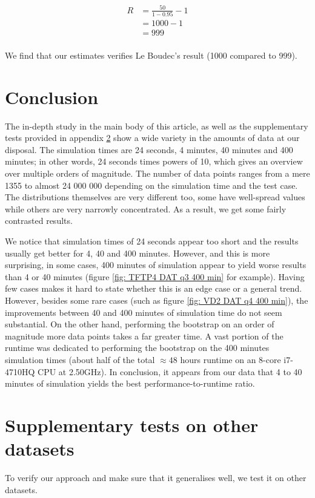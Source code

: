 \documentclass{article}
\begin{document}
\begin{align*}
    R & = \frac{50}{1 - 0.95} - 1 \\
      & = 1000 - 1                \\
      & = 999                     \\
\end{align*}

We find that our estimates verifies Le Boudec's result (1000 compared to 999).


\section{Conclusion}

The in-depth study in the main body of this article, as well as the supplementary tests provided in appendix \ref{app: supplementary tests on other datasets} show a wide variety in the amounts of data at our disposal. The simulation times are 24 seconds, 4 minutes, 40 minutes and 400 minutes; in other words, 24 seconds times powers of 10, which gives an overview over multiple orders of magnitude. The number of data points ranges from a mere 1355 to almost 24 000 000 depending on the simulation time and the test case. The distributions themselves are very different too, some have well-spread values while others are very narrowly concentrated. As a result, we get some fairly contrasted results.

We notice that simulation times of 24 seconds appear too short and the results usually get better for 4, 40 and 400 minutes. However, and this is more surprising, in some cases, 400 minutes of simulation appear to yield worse results than 4 or 40 minutes (figure \ref{fig: TFTP4 DAT q3 400 min} for example). Having few cases makes it hard to state whether this is an edge case or a general trend. However, besides some rare cases (such as figure \ref{fig: VD2 DAT q4 400 min}), the improvements between 40 and 400 minutes of simulation time do not seem substantial. On the other hand, performing the bootstrap on an order of magnitude more data points takes a far greater time. A vast portion of the runtime was dedicated to performing the bootstrap on the 400 minutes simulation times (about half of the total $\approx 48$ hours runtime on an 8-core i7-4710HQ CPU at 2.50GHz). In conclusion, it appears from our data that 4 to 40 minutes of simulation yields the best performance-to-runtime ratio.


\newpage
\appendix
\section{Supplementary tests on other datasets}
\label{app: supplementary tests on other datasets}
To verify our approach and make sure that it generalises well, we test it on other datasets.
\end{document}
